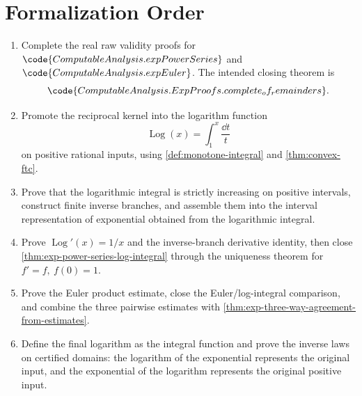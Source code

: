\section{Formalization Order}

\begin{enumerate}
\item Complete the real raw validity proofs for
\(\code{ComputableAnalysis.expPowerSeries}\) and
\(\code{ComputableAnalysis.expEuler}\).  The intended closing theorem is
\[
  \code{ComputableAnalysis.ExpProofs.complete_of_remainders}.
\]

\item Promote the reciprocal kernel into the logarithm function
\[
  \operatorname{Log}(x)=\int_1^x \frac{\dd t}{t}
\]
on positive rational inputs, using \cref{def:monotone-integral} and
\cref{thm:convex-ftc}.

\item Prove that the logarithmic integral is strictly increasing on positive
intervals, construct finite inverse branches, and assemble them into the
interval representation of exponential obtained from the logarithmic
integral.

\item Prove \(\operatorname{Log}'(x)=1/x\) and the inverse-branch derivative identity, then
close \cref{thm:exp-power-series-log-integral} through the uniqueness theorem
for \(f'=f,\ f(0)=1\).

\item Prove the Euler product estimate, close the Euler/log-integral
comparison, and combine the three pairwise estimates with
\cref{thm:exp-three-way-agreement-from-estimates}.

\item Define the final logarithm as the integral function and prove the
inverse laws on certified domains:
the logarithm of the exponential represents the original input, and the
exponential of the logarithm represents the original positive input.
\end{enumerate}
